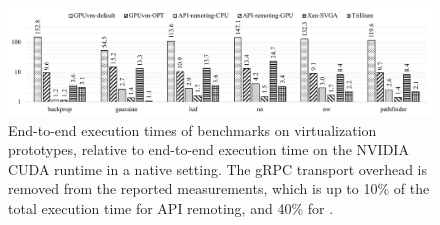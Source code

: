 
% 



\begin{figure}[!ht!!]
	\centering
	\includegraphics[width=.9\linewidth,clip]{trillium/data/cross_product_overhead_noRPC_OptInit.pdf}
	\caption{{\footnotesize End-to-end execution times of benchmarks on virtualization prototypes, relative to end-to-end execution time on the NVIDIA CUDA runtime in a native setting.
			The gRPC transport overhead is removed from the reported measurements, which is up to 10\% of the total execution time for API remoting, and 40\% for \Trillium.}}
	\label{fig_all_overhead} \end{figure}

